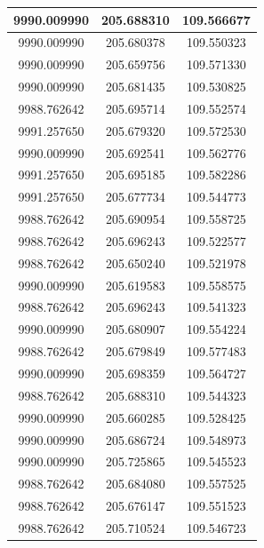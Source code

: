 \documentclass[a4paper,14pt]{article}
\begin{document}
\begin{longtable}[c]{|c|c|c|}
	9990.009990       & 205.688310           & 109.566677        \\ \hline
	9990.009990       & 205.680378           & 109.550323        \\ \hline
	9990.009990       & 205.659756           & 109.571330        \\ \hline
	9990.009990       & 205.681435           & 109.530825        \\ \hline
	9988.762642       & 205.695714           & 109.552574        \\ \hline
	9991.257650       & 205.679320           & 109.572530        \\ \hline
	9990.009990       & 205.692541           & 109.562776        \\ \hline
	9991.257650       & 205.695185           & 109.582286        \\ \hline
	9991.257650       & 205.677734           & 109.544773        \\ \hline
	9988.762642       & 205.690954           & 109.558725        \\ \hline
	9988.762642       & 205.696243           & 109.522577        \\ \hline
	9988.762642       & 205.650240           & 109.521978        \\ \hline
	9990.009990       & 205.619583           & 109.558575        \\ \hline
	9988.762642       & 205.696243           & 109.541323        \\ \hline
	9990.009990       & 205.680907           & 109.554224        \\ \hline
	9988.762642       & 205.679849           & 109.577483        \\ \hline
	9990.009990       & 205.698359           & 109.564727        \\ \hline
	9988.762642       & 205.688310           & 109.544323        \\ \hline
	9990.009990       & 205.660285           & 109.528425        \\ \hline
	9990.009990       & 205.686724           & 109.548973        \\ \hline
	9990.009990       & 205.725865           & 109.545523        \\ \hline
	9988.762642       & 205.684080           & 109.557525        \\ \hline
	9988.762642       & 205.676147           & 109.551523        \\ \hline
	9988.762642       & 205.710524           & 109.546723        \\ \hline

\end{longtable}
\end{document}
